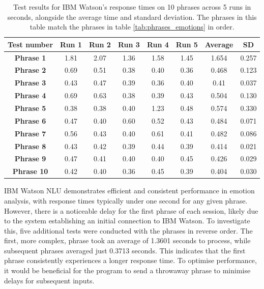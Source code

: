\begin{table}[h!]
\centering{}
\caption{Test results for IBM Watson's response times on 10 phrases across 5 runs in seconds, alongside the average time and standard deviation. The phrases in this table match the phrases in table \ref{tab:phrases_emotions} in order.}
\begin{tabular}{|c|c|c|c|c|c|c|c|}
\hline
\textbf{Test number} & \textbf{Run 1} & \textbf{Run 2} & \textbf{Run 3} & \textbf{Run 4} & \textbf{Run 5} & \textbf{Average} & \textbf{SD} \\ \hline
\textbf{Phrase 1}    & 1.81 & 2.07 & 1.36 & 1.58 & 1.45 & 1.654 & 0.257        \\ \hline
\textbf{Phrase 2}    & 0.69 & 0.51 & 0.38 & 0.40 & 0.36 & 0.468 & 0.123        \\ \hline
\textbf{Phrase 3}    & 0.43 & 0.47 & 0.39 & 0.36 & 0.40 & 0.41 &  0.037       \\ \hline
\textbf{Phrase 4}    & 0.69 & 0.63 & 0.38 & 0.39 & 0.43 & 0.504 & 0.130        \\ \hline
\textbf{Phrase 5}    & 0.38 & 0.38 & 0.40 & 1.23 & 0.48 & 0.574 & 0.330        \\ \hline
\textbf{Phrase 6}    & 0.47 & 0.40 & 0.60 & 0.52 & 0.43 & 0.484 & 0.071        \\ \hline
\textbf{Phrase 7}    & 0.56 & 0.43 & 0.40 & 0.61 & 0.41 & 0.482 & 0.086        \\ \hline
\textbf{Phrase 8}    & 0.43 & 0.42 & 0.39 & 0.44 & 0.39 & 0.414 & 0.021        \\ \hline
\textbf{Phrase 9}    & 0.47 & 0.41 & 0.40 & 0.40 & 0.45 & 0.426 & 0.029        \\ \hline
\textbf{Phrase 10}   & 0.42 & 0.40 & 0.36 & 0.45 & 0.39 & 0.404 & 0.030        \\ \hline
\end{tabular}
\label{tab:phrase_tests}
\end{table}

IBM Watson NLU demonstrates efficient and consistent performance in emotion analysis, with response times typically under one second for any given phrase. However, there is a noticeable delay for the first phrase of each session, likely due to the system establishing an initial connection to IBM Watson. To investigate this, five additional tests were conducted with the phrases in reverse order. The first, more complex, phrase took an average of 1.3601 seconds to process, while subsequent phrases averaged just 0.3713 seconds. This indicates that the first phrase consistently experiences a longer response time. To optimise performance, it would be beneficial for the program to send a throwaway phrase to minimise delays for subsequent inputs.

